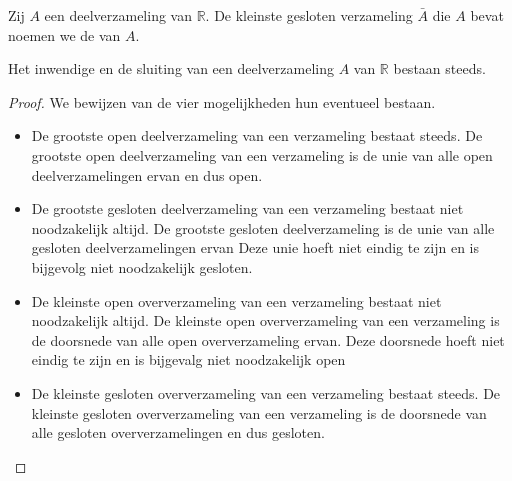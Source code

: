 \documentclass[main.tex]{subfiles}
\begin{document}
\begin{de}
  Zij $A$ een deelverzameling van $\mathbb{R}$.
  De kleinste gesloten verzameling $\bar{A}$ die $A$ bevat noemen we de  van $A$.
\end{de}

\begin{st}
  Het inwendige en de sluiting van een deelverzameling $A$ van $\mathbb{R}$ bestaan steeds.

  \begin{proof}
    We bewijzen van de vier mogelijkheden hun eventueel bestaan.
    \begin{itemize}
    \item De grootste open deelverzameling van een verzameling bestaat steeds.
      De grootste open deelverzameling van een verzameling is de unie van alle open deelverzamelingen ervan en dus open.
    \item De grootste gesloten deelverzameling van een verzameling bestaat niet noodzakelijk altijd.
      De grootste gesloten deelverzameling is de unie van alle gesloten deelverzamelingen ervan
      Deze unie hoeft niet eindig te zijn en is bijgevolg niet noodzakelijk gesloten.
    \item De kleinste open oververzameling van een verzameling bestaat niet noodzakelijk altijd.
      De kleinste open oververzameling van een verzameling is de doorsnede van alle open oververzameling ervan.
      Deze doorsnede hoeft niet eindig te zijn en is bijgevalg niet noodzakelijk open
    \item De kleinste gesloten oververzameling van een verzameling bestaat steeds.
      De kleinste gesloten oververzameling van een verzameling is de doorsnede van alle gesloten oververzamelingen en dus gesloten.
    \end{itemize}
  \end{proof}
\end{st}
\end{document}

